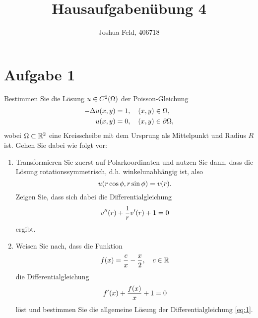 \documentclass{exercise}
\institute{Applied and Computational Mathematics}
\title{Hausaufgabenübung 4}
\author{Joshua Feld, 406718}
\begin{document}
    \maketitle


    \section*{Aufgabe 1}

    \begin{problem}
        Bestimmen Sie die Lösung \(u \in C^2\parentheses*{\Omega}\) der Poisson-Gleichung
        \begin{align*}
            -\Delta u\parentheses*{x, y} &= 1, \quad \parentheses*{x, y} \in \Omega,\\
            u\parentheses*{x, y} &= 0, \quad \parentheses*{x, y} \in \partial\Omega,
        \end{align*}
        wobei \(\Omega \subset \mathbb{R}^2\) eine Kreisscheibe mit dem Ursprung als Mittelpunkt und Radius \(R\) ist.
        Gehen Sie dabei wie folgt vor:
        \begin{enumerate}
            \item Transformieren Sie zuerst auf Polarkoordinaten und nutzen Sie dann, dass die Lösung rotationssymmetrisch, d.h. winkelunabhängig ist, also
            \[
                u\parentheses*{r\cos\phi, r\sin\phi} = v\parentheses*{r}.
            \]
            Zeigen Sie, dass sich dabei die Differentialgleichung
            \begin{equation}\label{eq:1}
                v''\parentheses*{r} + \frac{1}{r}v'\parentheses*{r} + 1 = 0
            \end{equation}
            ergibt.
            \item Weisen Sie nach, dass die Funktion
            \[
                f\parentheses*{x} = \frac{c}{x} - \frac{x}{2}, \quad c \in \R
            \]
            die Differentialgleichung
            \[
                f'\parentheses*{x} + \frac{f\parentheses*{x}}{x} + 1 = 0
            \]
            löst und bestimmen Sie die allgemeine Lösung der Differentialgleichung \eqref{eq:1}.
        \end{enumerate}
    \end{problem}
\end{document}
